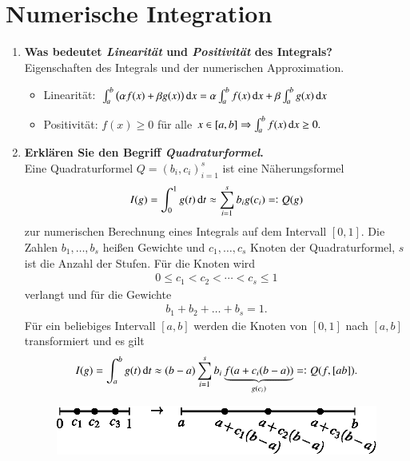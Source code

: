\section{Numerische Integration}
	\begin{enumerate}
		\item \textbf{Was bedeutet \textit{Linearität} und \textit{Positivität} des Integrals?} \\
		Eigenschaften des Integrals und der numerischen Approximation.
		\begin{itemize}
			\item Linearität: \quad \(\int_{a}^{b}\left(\alpha f(x)+\beta g(x)\right)\dif{x} = \alpha \int_{a}^{b}f(x)\dif{x}+\beta\int_{a}^{b}g(x)\dif{x}\)
			\item Positivität: \quad \(f(x)\geq0\) für alle \(x\in[a,b]\Rightarrow\int_{a}^{b}f(x)\dif{x}\geq0.\)
		\end{itemize}
		
		\item \textbf{Erklären Sie den Begriff \textit{Quadraturformel}.} \\
			Eine Quadraturformel \(Q=(b_i,c_i)^s_{i=1}\) ist eine Näherungsformel
			\begin{align*}
				I(g)=\int_{0}^{1}g(t)\dif{t}\approx\sum_{i=1}^{s}b_ig(c_i)=:Q(g)
			\end{align*}
			zur numerischen Berechnung eines Integrals auf dem Intervall \([0,1]\). Die Zahlen \(b_1,\dots,b_s\) heißen Gewichte und \(c_1,\dots,c_s\) Knoten der Quadraturformel, \(s\) ist die Anzahl der Stufen.
			Für die Knoten wird
			\begin{align*}
				0\leq c_1<c_2<\cdots<c_s\leq1
			\end{align*}
			verlangt und für die Gewichte
			\begin{align*}
				b_1+b_2+\dots+b_s=1.
			\end{align*}
			Für ein beliebiges Intervall \([a,b]\) werden die Knoten von \([0,1]\) nach \([a,b]\) transformiert und es gilt
			\begin{align*}
				I(g)=\int_{a}^{b}g(t)\dif{t}\approx(b-a)\sum_{i=1}^{s}b_i\underbrace{f(a+c_i(b-a))}_{g(c_i)}=:Q(f,[ab]).
			\end{align*}
			\begin{figure}[htbp]
				\centering
				\includegraphics[width=0.4\linewidth]{kap4_1}
			\end{figure}
		

\end{enumerate}
